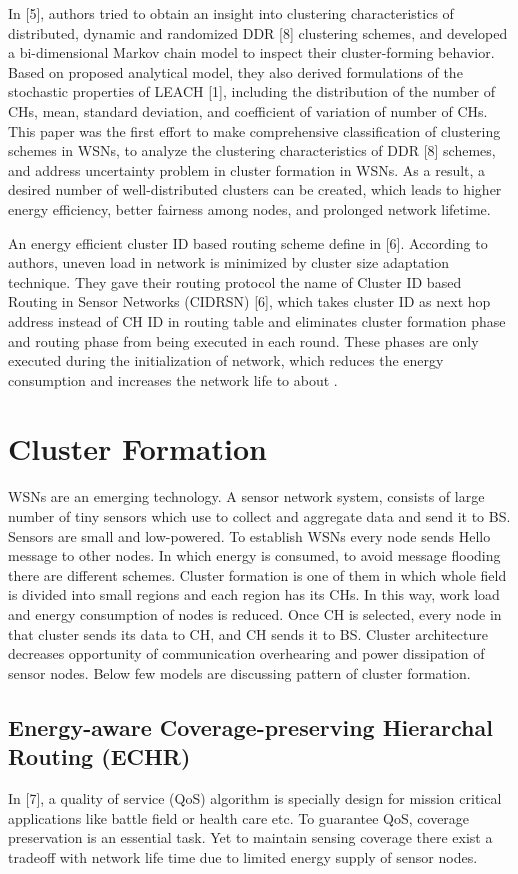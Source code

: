 \documentclass[10pt, conference, compsocconf]{IEEEtran}
\begin{document}
In [5], authors tried to obtain an insight into clustering characteristics of distributed, dynamic and randomized DDR [8] clustering schemes, and developed a bi-dimensional Markov chain model to inspect their cluster-forming behavior. Based on proposed analytical model, they also derived formulations of the stochastic properties of LEACH [1], including the distribution of the number of CHs, mean,  standard deviation, and coefficient of variation of number of CHs. This paper was the first effort to make comprehensive classification of clustering schemes in WSNs, to analyze the clustering characteristics of DDR [8] schemes, and address uncertainty problem in cluster formation in WSNs. As a result, a desired number of well-distributed clusters can be created, which leads to higher energy efficiency, better fairness among nodes, and prolonged network lifetime.

An energy efficient cluster ID based routing scheme define in [6]. According to authors, uneven load in network is minimized by cluster size adaptation technique. They gave their routing protocol the name of Cluster ID based Routing in Sensor Networks (CIDRSN) [6], which takes cluster ID as next hop address instead of CH ID in routing table and eliminates cluster formation phase and routing phase from being executed in each round. These phases are only executed during the initialization of network, which reduces the energy consumption and increases the network life to about .

\section{Cluster Formation}
WSNs are an emerging technology. A sensor network system, consists of large number of tiny sensors which use to collect and aggregate data and send it to BS. Sensors are small and low-powered. To establish  WSNs every node sends Hello message to other nodes. In which energy is consumed, to avoid message flooding there are different schemes. Cluster formation is one of them in which whole field is divided into small regions and each region has its CHs. In this way,  work load and energy consumption of nodes is reduced. Once CH is selected, every node in that cluster sends its data to CH, and CH sends it to BS. Cluster architecture decreases opportunity of communication overhearing and power dissipation of sensor nodes. Below few models are discussing pattern of cluster formation.

\subsection{Energy-aware Coverage-preserving Hierarchal Routing (ECHR)}
In [7], a quality of service (QoS) algorithm is specially design for mission critical applications like battle field or health care etc. To guarantee QoS, coverage preservation is an essential task. Yet to maintain sensing coverage there exist a tradeoff with network life time due to limited energy supply of sensor nodes.
\end{document}

